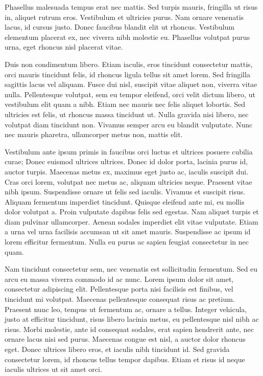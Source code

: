 Phasellus malesuada tempus erat nec mattis. Sed turpis mauris, fringilla ut risus in, aliquet rutrum eros. Vestibulum et ultricies purus. Nam ornare venenatis lacus, id cursus justo. Donec faucibus blandit elit ut rhoncus. Vestibulum elementum placerat ex, nec viverra nibh molestie eu. Phasellus volutpat purus urna, eget rhoncus nisl placerat vitae.

Duis non condimentum libero. Etiam iaculis, eros tincidunt consectetur mattis, orci mauris tincidunt felis, id rhoncus ligula tellus sit amet lorem. Sed fringilla sagittis lacus vel aliquam. Fusce dui nisl, suscipit vitae aliquet non, viverra vitae nulla. Pellentesque volutpat, sem eu tempor eleifend, orci velit dictum libero, ut vestibulum elit quam a nibh. Etiam nec mauris nec felis aliquet lobortis. Sed ultricies est felis, ut rhoncus massa tincidunt ut. Nulla gravida nisi libero, nec volutpat diam tincidunt non. Vivamus semper arcu eu blandit vulputate. Nunc nec mauris pharetra, ullamcorper metus non, mattis elit.

Vestibulum ante ipsum primis in faucibus orci luctus et ultrices posuere cubilia curae; Donec euismod ultrices ultrices. Donec id dolor porta, lacinia purus id, auctor turpis. Maecenas metus ex, maximus eget justo ac, iaculis suscipit dui. Cras orci lorem, volutpat nec metus ac, aliquam ultricies neque. Praesent vitae nibh ipsum. Suspendisse ornare ut felis sed iaculis. Vivamus et suscipit risus. Aliquam fermentum imperdiet tincidunt. Quisque eleifend ante mi, eu mollis dolor volutpat a. Proin vulputate dapibus felis sed egestas. Nam aliquet turpis et diam pulvinar ullamcorper. Aenean sodales imperdiet elit vitae vulputate. Etiam a urna vel urna facilisis accumsan ut sit amet mauris. Suspendisse ac ipsum id lorem efficitur fermentum. Nulla eu purus ac sapien feugiat consectetur in nec quam.

Nam tincidunt consectetur sem, nec venenatis est sollicitudin fermentum. Sed eu arcu eu massa viverra commodo id ac nunc. Lorem ipsum dolor sit amet, consectetur adipiscing elit. Pellentesque porta nisi facilisis est finibus, vel tincidunt mi volutpat. Maecenas pellentesque consequat risus ac pretium. Praesent nunc leo, tempus ut fermentum ac, ornare a tellus. Integer vehicula, justo at efficitur tincidunt, risus libero lacinia metus, eu pellentesque nisl nibh ac risus. Morbi molestie, ante id consequat sodales, erat sapien hendrerit ante, nec ornare lacus nisi sed purus. Maecenas congue est nisl, a auctor dolor rhoncus eget. Donec ultrices libero eros, et iaculis nibh tincidunt id. Sed gravida consectetur lorem, id rhoncus tellus tempor dapibus. Etiam et risus id neque iaculis ultrices ut sit amet orci.

